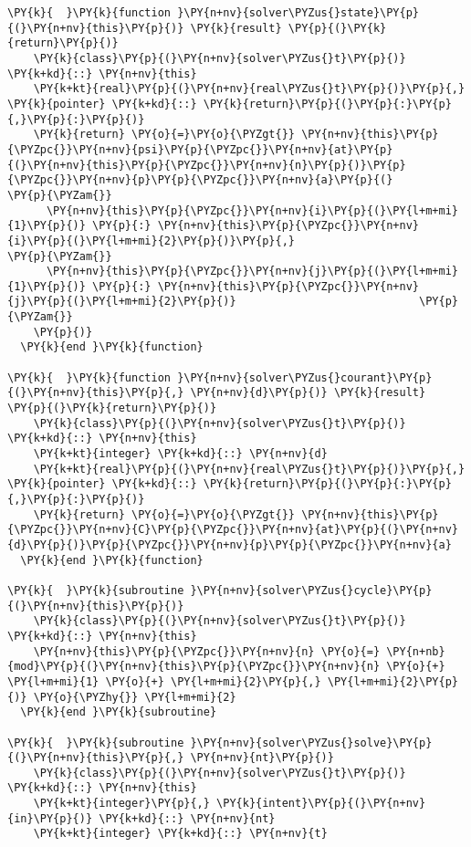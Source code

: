 \begin{Verbatim}[commandchars=\\\{\}]
\PY{k}{  }\PY{k}{function }\PY{n+nv}{solver\PYZus{}state}\PY{p}{(}\PY{n+nv}{this}\PY{p}{)} \PY{k}{result} \PY{p}{(}\PY{k}{return}\PY{p}{)}
    \PY{k}{class}\PY{p}{(}\PY{n+nv}{solver\PYZus{}t}\PY{p}{)} \PY{k+kd}{::} \PY{n+nv}{this}
    \PY{k+kt}{real}\PY{p}{(}\PY{n+nv}{real\PYZus{}t}\PY{p}{)}\PY{p}{,} \PY{k}{pointer} \PY{k+kd}{::} \PY{k}{return}\PY{p}{(}\PY{p}{:}\PY{p}{,}\PY{p}{:}\PY{p}{)}
    \PY{k}{return} \PY{o}{=}\PY{o}{\PYZgt{}} \PY{n+nv}{this}\PY{p}{\PYZpc{}}\PY{n+nv}{psi}\PY{p}{\PYZpc{}}\PY{n+nv}{at}\PY{p}{(}\PY{n+nv}{this}\PY{p}{\PYZpc{}}\PY{n+nv}{n}\PY{p}{)}\PY{p}{\PYZpc{}}\PY{n+nv}{p}\PY{p}{\PYZpc{}}\PY{n+nv}{a}\PY{p}{(}                 \PY{p}{\PYZam{}}
      \PY{n+nv}{this}\PY{p}{\PYZpc{}}\PY{n+nv}{i}\PY{p}{(}\PY{l+m+mi}{1}\PY{p}{)} \PY{p}{:} \PY{n+nv}{this}\PY{p}{\PYZpc{}}\PY{n+nv}{i}\PY{p}{(}\PY{l+m+mi}{2}\PY{p}{)}\PY{p}{,}                           \PY{p}{\PYZam{}}
      \PY{n+nv}{this}\PY{p}{\PYZpc{}}\PY{n+nv}{j}\PY{p}{(}\PY{l+m+mi}{1}\PY{p}{)} \PY{p}{:} \PY{n+nv}{this}\PY{p}{\PYZpc{}}\PY{n+nv}{j}\PY{p}{(}\PY{l+m+mi}{2}\PY{p}{)}                            \PY{p}{\PYZam{}}
    \PY{p}{)}
  \PY{k}{end }\PY{k}{function}

\PY{k}{  }\PY{k}{function }\PY{n+nv}{solver\PYZus{}courant}\PY{p}{(}\PY{n+nv}{this}\PY{p}{,} \PY{n+nv}{d}\PY{p}{)} \PY{k}{result} \PY{p}{(}\PY{k}{return}\PY{p}{)}
    \PY{k}{class}\PY{p}{(}\PY{n+nv}{solver\PYZus{}t}\PY{p}{)} \PY{k+kd}{::} \PY{n+nv}{this}
    \PY{k+kt}{integer} \PY{k+kd}{::} \PY{n+nv}{d}
    \PY{k+kt}{real}\PY{p}{(}\PY{n+nv}{real\PYZus{}t}\PY{p}{)}\PY{p}{,} \PY{k}{pointer} \PY{k+kd}{::} \PY{k}{return}\PY{p}{(}\PY{p}{:}\PY{p}{,}\PY{p}{:}\PY{p}{)}
    \PY{k}{return} \PY{o}{=}\PY{o}{\PYZgt{}} \PY{n+nv}{this}\PY{p}{\PYZpc{}}\PY{n+nv}{C}\PY{p}{\PYZpc{}}\PY{n+nv}{at}\PY{p}{(}\PY{n+nv}{d}\PY{p}{)}\PY{p}{\PYZpc{}}\PY{n+nv}{p}\PY{p}{\PYZpc{}}\PY{n+nv}{a}
  \PY{k}{end }\PY{k}{function}

\PY{k}{  }\PY{k}{subroutine }\PY{n+nv}{solver\PYZus{}cycle}\PY{p}{(}\PY{n+nv}{this}\PY{p}{)}
    \PY{k}{class}\PY{p}{(}\PY{n+nv}{solver\PYZus{}t}\PY{p}{)} \PY{k+kd}{::} \PY{n+nv}{this}
    \PY{n+nv}{this}\PY{p}{\PYZpc{}}\PY{n+nv}{n} \PY{o}{=} \PY{n+nb}{mod}\PY{p}{(}\PY{n+nv}{this}\PY{p}{\PYZpc{}}\PY{n+nv}{n} \PY{o}{+} \PY{l+m+mi}{1} \PY{o}{+} \PY{l+m+mi}{2}\PY{p}{,} \PY{l+m+mi}{2}\PY{p}{)} \PY{o}{\PYZhy{}} \PY{l+m+mi}{2}
  \PY{k}{end }\PY{k}{subroutine}

\PY{k}{  }\PY{k}{subroutine }\PY{n+nv}{solver\PYZus{}solve}\PY{p}{(}\PY{n+nv}{this}\PY{p}{,} \PY{n+nv}{nt}\PY{p}{)}
    \PY{k}{class}\PY{p}{(}\PY{n+nv}{solver\PYZus{}t}\PY{p}{)} \PY{k+kd}{::} \PY{n+nv}{this}
    \PY{k+kt}{integer}\PY{p}{,} \PY{k}{intent}\PY{p}{(}\PY{n+nv}{in}\PY{p}{)} \PY{k+kd}{::} \PY{n+nv}{nt}
    \PY{k+kt}{integer} \PY{k+kd}{::} \PY{n+nv}{t}


\end{Verbatim}

